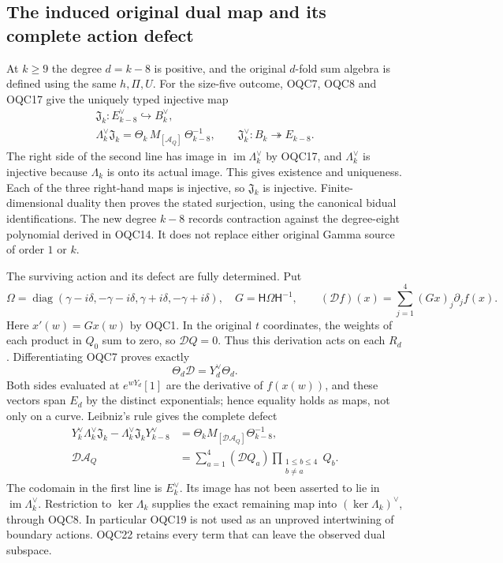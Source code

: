 \documentclass[11pt,a4paper]{article}
\begin{document}
\subsection{The induced original dual map and its complete action defect}
At $k\geq9$ the degree $d=k-8$ is positive, and the original
$d$-fold sum algebra is defined using the same $h,\Pi,U$.
For the size-five outcome, OQC7, OQC8 and OQC17 give the uniquely
typed injective map
\[
 \begin{gathered}
 \mathfrak J_k:E_{k-8}^\vee\hookrightarrow B_k^\vee,\\
 \Lambda_k^\vee\mathfrak J_k
        =\Theta_k\,M_{[\mathcal A_Q]}\,\Theta_{k-8}^{-1},\qquad
 \mathfrak J_k^\vee:B_k\twoheadrightarrow E_{k-8}.
 \end{gathered}\tag{OQC19}
\]
The right side of the second line has image in
$\operatorname{im}\Lambda_k^\vee$ by OQC17, and
$\Lambda_k^\vee$ is injective because $\Lambda_k$ is onto its
actual image. This gives existence and uniqueness. Each of the
three right-hand maps is injective, so $\mathfrak J_k$ is
injective. Finite-dimensional duality then proves the stated
surjection, using the canonical bidual identifications. The new
degree $k-8$ records contraction against the degree-eight
polynomial derived in OQC14. It does not replace either original
Gamma source of order $1$ or $k$.

The surviving action and its defect are fully determined. Put
\[
 \Omega=\operatorname{diag}(\gamma-i\delta,-\gamma-i\delta,
                              \gamma+i\delta,-\gamma+i\delta),
 \quad G=\mathsf H\Omega\mathsf H^{-1},\qquad
 (\mathcal Df)(x)=\sum_{j=1}^4(Gx)_j\partial_jf(x).
 \tag{OQC20}
\]
Here $x'(w)=Gx(w)$ by OQC1. In the original $t$ coordinates,
the weights of each product in $Q_0$ sum to zero, so
$\mathcal DQ=0$. Thus this derivation acts on each $R_d$.
Differentiating OQC7 proves exactly
\[
          \Theta_d\mathcal D=Y_d^\vee\Theta_d.
 \tag{OQC21}
\]
Both sides evaluated at $e^{wY_d}[1]$ are the derivative of
$f(x(w))$, and these vectors span $E_d$ by the distinct
exponentials; hence equality holds as maps, not only on a curve.
Leibniz's rule gives the complete defect
\[
 \begin{split}
 Y_k^\vee\Lambda_k^\vee\mathfrak J_k
       -\Lambda_k^\vee\mathfrak J_kY_{k-8}^\vee
 &=\Theta_k M_{[\mathcal D\mathcal A_Q]}\Theta_{k-8}^{-1},\\
 \mathcal D\mathcal A_Q
 &=\sum_{a=1}^4(\mathcal DQ_a)
                  \prod_{\substack{1\leq b\leq4\\b\ne a}}Q_b.
 \end{split}\tag{OQC22}
\]
The codomain in the first line is $E_k^\vee$. Its image has not
been asserted to lie in $\operatorname{im}\Lambda_k^\vee$.
Restriction to $\ker\Lambda_k$ supplies the exact remaining
map into $(\ker\Lambda_k)^\vee$, through OQC8. In particular
OQC19 is not used as an unproved intertwining of boundary actions.
OQC22 retains every term that can leave the observed dual subspace.
\end{document}
